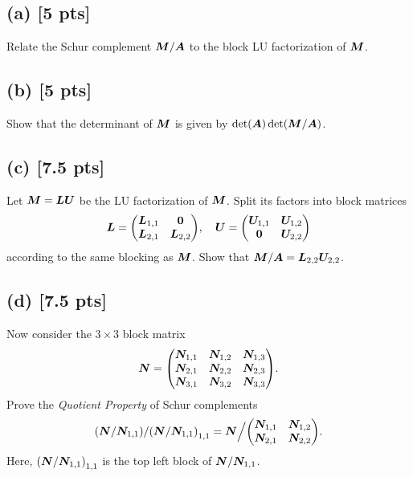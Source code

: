 \documentclass[twoside,10pt]{article}
\begin{document}
\subsection*{(a) [5 pts]} 
  Relate the Schur complement $\bm{M} / \bm{A}$ to the block LU factorization of $\bm{M}$.

\subsection*{(b) [5 pts]} 
  Show that the determinant of $\bm{M}$ is given by $\det\left(\mtx{A}\right) \det\left(\mtx{M} / \mtx{A}\right)$.

\subsection*{(c) [7.5 pts]}
  Let $\bm{M} = \bm{L} \bm{U}$ be the LU factorization of $\bm{M}$. 
  Split its factors into block matrices 
  \begin{equation} 
    \mtx{L} = 
    \begin{pmatrix}
      \mtx{L}_{1, 1} & \mtx{0} \\
      \mtx{L}_{2, 1} & \mtx{L}_{2, 2}
    \end{pmatrix},
    \quad 
    \mtx{U} = 
    \begin{pmatrix}
      \mtx{U}_{1, 1} & \mtx{U}_{1, 2} \\
      \mtx{0} & \mtx{U}_{2, 2}
    \end{pmatrix}
  \end{equation}
  according to the same blocking as $\bm{M}$.
  Show that $\bm{M} / \bm{A} = \bm{L}_{2, 2} \bm{U}_{2, 2}$. 

\subsection*{(d) [7.5 pts]}
Now consider the $3 \times 3$ block matrix 
\begin{equation}
  \mtx{N} = 
  \begin{pmatrix}
    \mtx{N}_{1, 1} & \mtx{N}_{1, 2} & \mtx{N}_{1, 3} \\
    \mtx{N}_{2, 1} & \mtx{N}_{2, 2} & \mtx{N}_{2, 3} \\
    \mtx{N}_{3, 1} & \mtx{N}_{3, 2} & \mtx{N}_{3, 3}
  \end{pmatrix}.
\end{equation}
Prove the \emph{Quotient Property} of Schur complements
\begin{equation}
  \left(\mtx{N} / \mtx{N}_{1, 1}\right) / \left(\mtx{N} / \mtx{N}_{1, 1}\right)_{1, 1} 
  = 
  \mtx{N} \Big / 
  \begin{pmatrix}
    \mtx{N}_{1, 1} & \mtx{N}_{1, 2} \\
    \mtx{N}_{2, 1} & \mtx{N}_{2, 2} 
  \end{pmatrix}.
\end{equation}
Here, $\left(\mtx{N} / \mtx{N}_{1, 1}\right)_{1, 1}$ is the top left block of $\bm{N} / \bm{N}_{1, 1}$. 
\end{document}
